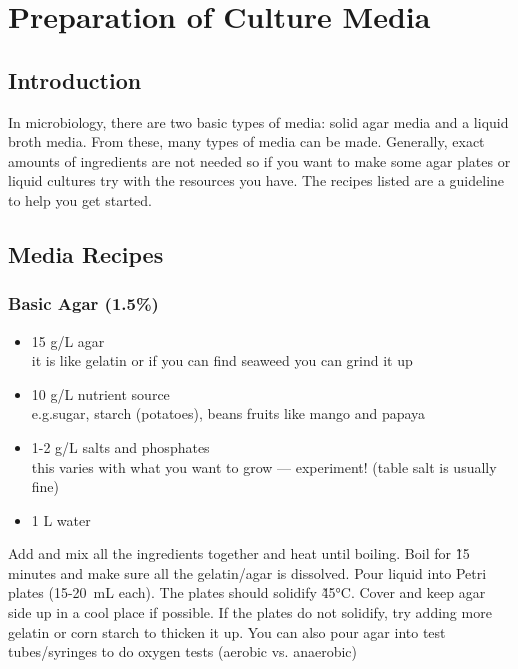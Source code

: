 \chapter{Preparation of Culture Media}

\section{Introduction}

In microbiology, there are two basic types of media: solid agar media and a liquid broth media. From these, many types of media can be made. Generally, exact amounts of ingredients are not needed so if you want to make some agar plates or liquid cultures try with the resources you have. The recipes listed are a guideline to help you get started.

\section{Media Recipes}

\subsection{Basic Agar (1.5\%)}

\begin{itemize}

\item{15 g/L agar\\
it is like gelatin or if you can find seaweed you can grind it up}

\item{10 g/L nutrient source\\
e.g.sugar, starch (potatoes), beans fruits like mango and papaya}

\item{1-2 g/L salts and phosphates\\
this varies with what you want to grow — experiment! (table salt is usually fine)}

\item{1 L water}

\end{itemize}

Add and mix all the ingredients together and heat until boiling. Boil for \~15 minutes and make sure all the gelatin/agar is dissolved. Pour liquid into Petri plates (15-20~mL each). The plates should solidify \~45°C. Cover and keep agar side up in a cool place if possible. If the plates do not solidify, try adding more gelatin or corn starch to thicken it up. You can also pour agar into test tubes/syringes to do oxygen tests (aerobic vs. anaerobic)

